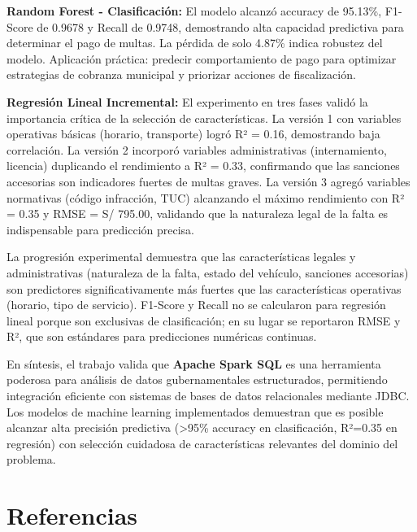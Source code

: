 \documentclass[12pt,a4paper]{article}
\begin{document}
\textbf{Random Forest - Clasificación:} El modelo alcanzó accuracy de 95.13\%, F1-Score de 0.9678 y Recall de 0.9748, demostrando alta capacidad predictiva para determinar el pago de multas. La pérdida de solo 4.87\% indica robustez del modelo. Aplicación práctica: predecir comportamiento de pago para optimizar estrategias de cobranza municipal y priorizar acciones de fiscalización.

\textbf{Regresión Lineal Incremental:} El experimento en tres fases validó la importancia crítica de la selección de características. La versión 1 con variables operativas básicas (horario, transporte) logró R² = 0.16, demostrando baja correlación. La versión 2 incorporó variables administrativas (internamiento, licencia) duplicando el rendimiento a R² = 0.33, confirmando que las sanciones accesorias son indicadores fuertes de multas graves. La versión 3 agregó variables normativas (código infracción, TUC) alcanzando el máximo rendimiento con R² = 0.35 y RMSE = S/ 795.00, validando que la naturaleza legal de la falta es indispensable para predicción precisa.

La progresión experimental demuestra que las características legales y administrativas (naturaleza de la falta, estado del vehículo, sanciones accesorias) son predictores significativamente más fuertes que las características operativas (horario, tipo de servicio). F1-Score y Recall no se calcularon para regresión lineal porque son exclusivas de clasificación; en su lugar se reportaron RMSE y R², que son estándares para predicciones numéricas continuas.

En síntesis, el trabajo valida que \textbf{Apache Spark SQL} es una herramienta poderosa para análisis de datos gubernamentales estructurados, permitiendo integración eficiente con sistemas de bases de datos relacionales mediante JDBC. Los modelos de machine learning implementados demuestran que es posible alcanzar alta precisión predictiva (>95\% accuracy en clasificación, R²=0.35 en regresión) con selección cuidadosa de características relevantes del dominio del problema.

\newpage
\section*{Referencias}
\end{document}

